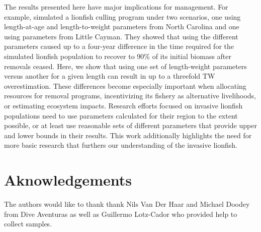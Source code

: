 \documentclass[fleqn,10pt,lineno]{wlpeerj} %
\begin{document}
The results presented here have major implications for management. For
example, \citet{edwards_2014} simulated a lionfish culling program under
two scenarios, one using length-at-age and length-to-weight parameters
from North Carolina and one using parameters from Little Cayman. They
showed that using the different parameters caused up to a four-year
difference in the time required for the simulated lionfish population to
recover to 90\% of its initial biomass after removals ceased. Here, we
show that using one set of length-weight parameters versus another for a
given length can result in up to a threefold TW overestimation. These
differences become especially important when allocating resources for
removal programs, incentivizing its fishery as alternative livelihoods,
or estimating ecosystem impacts. Research efforts focused on invasive
lionfish populations need to use parameters calculated for their region
to the extent possible, or at least use reasonable sets of different
parameters that provide upper and lower bounds in their results. This
work additionally highlights the need for more basic research that
furthers our understanding of the invasive lionfish.

\section*{Aknowledgements}

The authors would like to thank thank Nils Van Der Haar and Michael
Doodey from Dive Aventuras as well as Guillermo Lotz-Cador who provided
help to collect samples.


\end{document}
